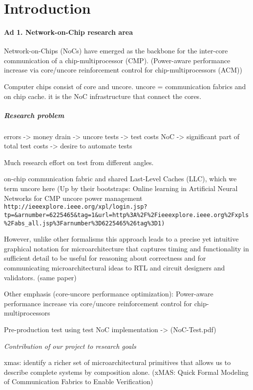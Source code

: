 \section*{Introduction}

\paragraph{Ad 1. Network-on-Chip research area}
 Network-on-Chips (NoCs) have emerged as the backbone for the inter-core communication of a chip-multiprocessor (CMP). (Power-aware performance increase via core/uncore reinforcement control for chip-multiprocessors (ACM))
 
Computer chips consist of core and uncore. uncore = communication fabrics and on chip cache. it is the NoC infrastructure that connect the cores.

\subparagraph{Research problem} 

errors -> money drain -> uncore tests -> test costs NoC -> significant part of total test costs -> desire to automate tests 

Much research effort on test from different angles.

on-chip communication fabric and shared Last-Level Caches (LLC), which we term uncore here (Up by their bootstraps: Online learning in Artificial Neural Networks for CMP uncore power management \verb^http://ieeexplore.ieee.org/xpl/login.jsp?tp=&arnumber=6225465&tag=1&url=http%3A%2F%2Fieeexplore.ieee.org%2Fxpls%2Fabs_all.jsp%3Farnumber%3D6225465%26tag%3D1)^

However, unlike other formalisms this approach leads to a precise yet intuitive graphical notation for microarchitecture that captures timing and functionality in sufficient detail to be useful for reasoning about correctness and for communicating microarchitectural ideas to RTL and circuit designers and validators.
(same paper)

Other emphasis (core-uncore performance optimization):
Power-aware performance increase via core/uncore reinforcement control for chip-multiprocessors

Pre-production test using test NoC implementation -> (NoC-Test.pdf)

\textit{Contribution of our project to research goals}

xmas: identify a richer set of microarchitectural primitives that allows us to describe complete systems by composition alone. (xMAS: Quick Formal Modeling of Communication Fabrics to Enable Verification)

